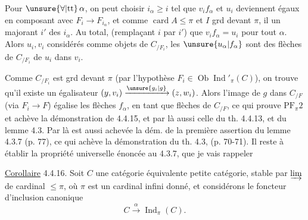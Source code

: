 Pour $\unsure{\forall|\mathrm{tt}}\,\alpha$, on peut choisir $i_\alpha\geq i$ tel que $v_if_\alpha$ et $u_i$ deviennent égaux en composant avec $F_i\longrightarrow F_{i_\alpha}$, et comme $\operatorname{card} A\leq\pi$ et $I$ grd devant $\pi$, il   un majorant $i'$ des $i_\alpha$. Au total,   (remplaçant $i$ par $i'$) que $v_i f_\alpha=u_i$ pour tout $\alpha$. Alors $u_i,v_i$  considérés comme objets de $C_{/F_i}$, les $\unsure{u_\alpha|f_\alpha}$ sont des flèches de $C_{/F_i}$ de $u_i$ dans $v_i$.
\margin{$\unsure{=}$}

Comme $C_{/F_i}$ est grd devant $\pi$ (par l'hypothèse $F_i\in\operatorname{Ob}\operatorname{Ind}'_\pi(C)$), on trouve qu'il existe un égalisateur $(y,v_i)\xrightarrow{\unsure{g_i|g}}(z,w_i)$.
Alors l'image de $g$ dans $C_{/F}$ (via $F_i\longrightarrow F$) égalise les flèches $f_\alpha$, en tant que flèches de $C_{/F}$, ce qui prouve $\mathrm{PF}_\pi2$ et achève la démonstration de 4.4.15, et par là aussi celle du th. 4.4.13, et du lemme 4.3. Par là est aussi achevée la dém. de la première assertion du lemme
4.3.7 (p. 77), ce qui achève la démonstration du th. 4.3, (p. 70-71). Il reste à établir la propriété universelle énoncée au 4.3.7, que je vais rappeler

\uline{Corollaire} 4.4.16. Soit $C$ une catégorie équivalente  petite catégorie, stable par $\varinjlim$ de cardinal $\leq\pi$, où $\pi$ est un cardinal infini donné, et considérons le foncteur d'inclusion canonique
\[
 C\xrightarrow{\alpha}\operatorname{Ind}_\pi(C).\tag*{(4.4.16.1)}
\]

